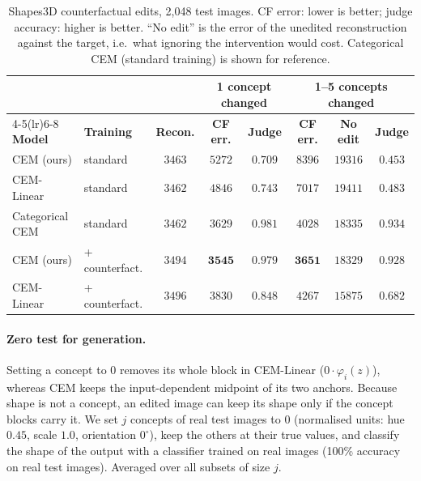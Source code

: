 \begin{table}[h]
\centering\small
\caption{Shapes3D counterfactual edits, 2{,}048 test images. CF error: lower
is better; judge accuracy: higher is better. ``No edit'' is the error of the
unedited reconstruction against the target, i.e.\ what ignoring the
intervention would cost. Categorical CEM (standard training) is shown for
reference.}
\label{tab:app-cf}
\begin{tabular}{llcccccc}
\toprule
 & & & \multicolumn{2}{c}{\textbf{1 concept changed}} & \multicolumn{3}{c}{\textbf{1--5 concepts changed}} \\
\cmidrule(lr){4-5}\cmidrule(lr){6-8}
\textbf{Model} & \textbf{Training} & \textbf{Recon.} & \textbf{CF err.} & \textbf{Judge} &
\textbf{CF err.} & \textbf{No edit} & \textbf{Judge} \\
\midrule
CEM (ours)      & standard       & $3463$ & $5272$ & $0.709$ & $8396$ & $19316$ & $0.453$ \\
CEM-Linear      & standard       & $3462$ & $4846$ & $0.743$ & $7017$ & $19411$ & $0.483$ \\
Categorical CEM & standard       & $3462$ & $3629$ & $\mathbf{0.981}$ & $4028$ & $18335$ & $\mathbf{0.934}$ \\
\midrule
CEM (ours)      & + counterfact. & $3494$ & $\mathbf{3545}$ & $0.979$ & $\mathbf{3651}$ & $18329$ & $0.928$ \\
CEM-Linear      & + counterfact. & $3496$ & $3830$ & $0.848$ & $4267$ & $15875$ & $0.682$ \\
\bottomrule
\end{tabular}
\end{table}

\paragraph{Zero test for generation.} Setting a concept to $0$ removes its
whole block in CEM-Linear ($0 \cdot \varphi_i(z)$), whereas CEM keeps the
input-dependent midpoint of its two anchors. Because shape is not a concept,
an edited image can keep its shape only if the concept blocks carry it. We
set $j$ concepts of real test images to $0$ (normalised units: hue $0.45$,
scale $1.0$, orientation $0^\circ$), keep the others at their true values, and
classify the shape of the output with a classifier trained on real images
(100\% accuracy on real test images). Averaged over all subsets of size $j$.

